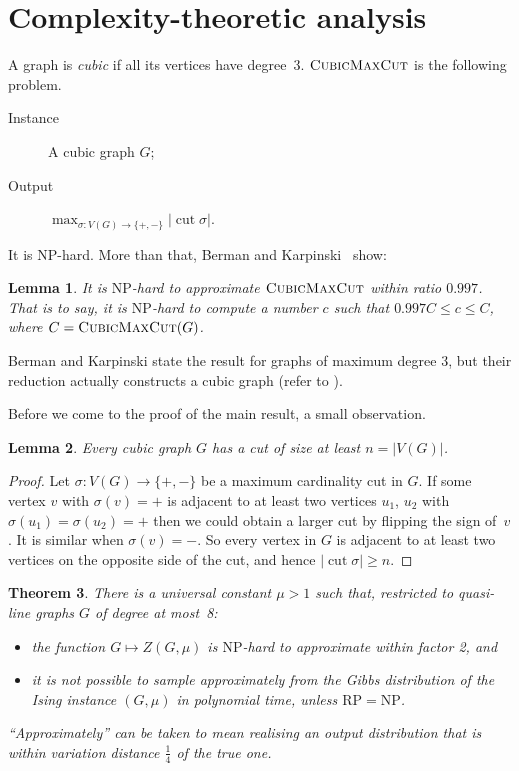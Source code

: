 \documentclass[11pt]{amsart}
\newcommand{\cut}{\mathop{\mathrm{cut}}}
\newcommand{\cubicmaxcut}{\textsc{Cubic\-MaxCut}}
\newcommand{\NP}{\mathrm{NP}}
\newtheorem{theorem}{Theorem}
\newtheorem{lemma}[theorem]{Lemma}
\begin{document}
\section{Complexity-theoretic analysis}

A graph is \emph{cubic} if all its vertices have degree~3.  $\cubicmaxcut$ is the following problem.
\begin{description}
\item[Instance] A cubic graph $G$; 
\item[Output] $\max_{\sigma:V(G)\to\{+,-\}}|\cut\sigma|$.  
\end{description}
It is NP-hard.  More than that, Berman and Karpinski~\cite[Thm 1(1)]{BermanKarpinski} show:

\begin{lemma}\label{lem:BK}
It is $\NP$-hard to approximate $\cubicmaxcut$ within ratio $0.997$. That is to say, it is $\NP$-hard to compute a number $c$ such that $0.997C\leq c\leq C$, where $C=\cubicmaxcut(G)$. 
\end{lemma}
Berman and Karpinski state the result for graphs of maximum degree 3, but their reduction actually constructs a cubic graph (refer to \cite[\S3]{BermanKarpinski}).

Before we come to the proof of the main result, a small observation.
\begin{lemma}\label{lem:Cgen}
Every cubic graph $G$ has a cut of size at least $n=|V(G)|$.
\end{lemma}

\begin{proof}
Let $\sigma:V(G)\to\{+,-\}$ be a maximum cardinality cut in $G$.  If some vertex $v$ with $\sigma(v)={+}$ is adjacent to at least two vertices $u_1$, $u_2$ with $\sigma(u_1)=\sigma(u_2)={+}$ then we could obtain a larger cut by flipping the sign of~$v$.  It is similar when $\sigma(v)={-}$.  So every vertex in $G$ is adjacent to at least two vertices on the opposite side of the cut, and hence $|\cut\sigma|\geq n$.
\end{proof}

\begin{theorem}\label{thm:NPhard}
There is a universal constant $\mu>1$ such that, restricted to quasi-line graphs $G$ of degree at most~8:  
\begin{itemize}
\item the function $G\mapsto Z(G,\mu)$ is $\NP$-hard to approximate within factor 2, and
\item it is not possible to sample approximately from the Gibbs distribution of the Ising instance $(G,\mu)$ in polynomial time, unless $\mathrm{RP}=\mathrm{NP}$. 
\end{itemize}
``Approximately'' can be taken to mean realising an output distribution that is within variation distance $\frac14$ of the true one.
\end{theorem}
\end{document}

